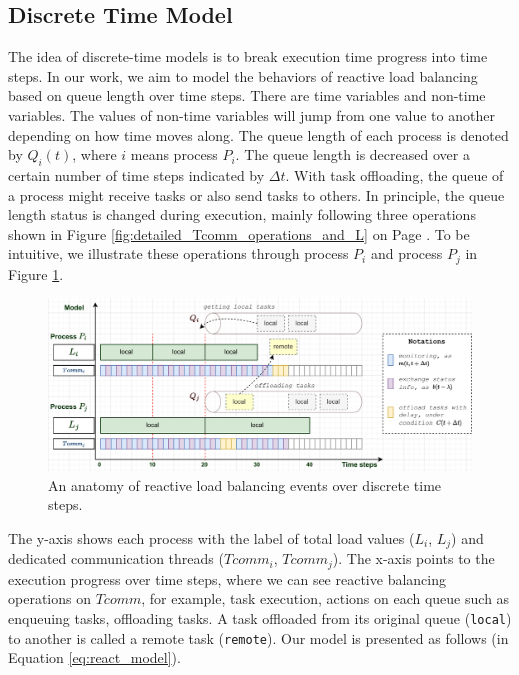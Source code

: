 \subsection{Discrete Time Model} \label{subsec:discrete_time_model}

The idea of discrete-time models is to break execution time progress into time steps. In our work, we aim to model the behaviors of reactive load balancing based on queue length over time steps. There are time variables and non-time variables. The values of non-time variables will jump from one value to another depending on how time moves along. The queue length of each process is denoted by $Q_{i}(t)$, where $i$ means process $P_{i}$. The queue length is decreased over a certain number of time steps indicated by $\Delta t$. With task offloading, the queue of a process might receive tasks or also send tasks to others. In principle, the queue length status is changed during execution, mainly following three operations shown in Figure \ref{fig:detailed_Tcomm_operations_and_L} on Page \pageref{fig:detailed_Tcomm_operations_and_L}. To be intuitive, we illustrate these operations through process $P_{i}$ and process $P_{j}$ in Figure \ref{fig:anatomy_react_events}.\\

\begin{figure}[t]
  \centering
  \includegraphics[scale=0.65]{./pictures/perf_analysis_model/perf_discrete_time_model.pdf}
	\caption{An anatomy of reactive load balancing events over discrete time steps.}
	\label{fig:anatomy_react_events}
\end{figure}

The y-axis shows each process with the label of total load values ($L_{i}$, $L_{j}$) and dedicated communication threads ($Tcomm_{i}$, $Tcomm_{j}$). The x-axis points to the execution progress over time steps, where we can see reactive balancing operations on $Tcomm$, for example, task execution, actions on each queue such as enqueuing tasks, offloading tasks. A task offloaded from its original queue (\texttt{local}) to another is called a remote task (\texttt{remote}). Our model is presented as follows (in Equation \ref{eq:react_model}).

